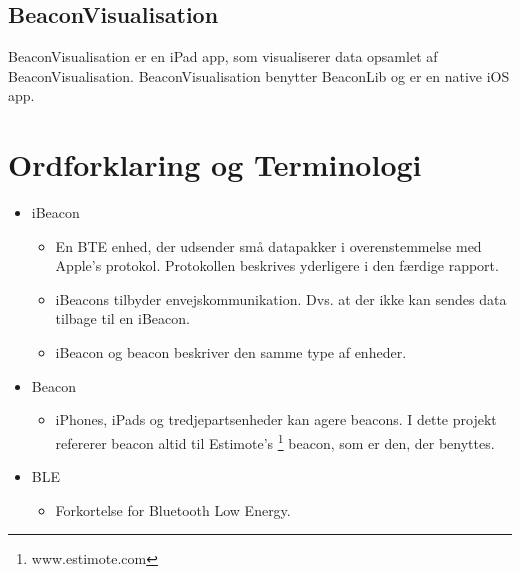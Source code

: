 \subsection{BeaconVisualisation}
BeaconVisualisation er en iPad app, som visualiserer data opsamlet af BeaconVisualisation. BeaconVisualisation benytter BeaconLib og er en native iOS app.

\section{Ordforklaring og Terminologi}

\begin{itemize}
	\item iBeacon
		\begin{itemize}
			\item En BTE enhed, der udsender små datapakker i overenstemmelse med Apple's protokol. Protokollen beskrives yderligere i den færdige rapport.
			\item iBeacons tilbyder envejskommunikation. Dvs. at der ikke kan sendes data tilbage til en iBeacon.
			\item iBeacon og beacon beskriver den samme type af enheder.
		\end{itemize}
		
	\item Beacon
		\begin{itemize}
			\item iPhones, iPads og tredjepartsenheder kan agere beacons. I dette projekt refererer beacon altid til Estimote's \footnote{www.estimote.com} beacon, som er den, der benyttes.
		\end{itemize}
		
	\item BLE
		\begin{itemize}
			\item Forkortelse for Bluetooth Low Energy.
		\end{itemize}
\end{itemize}